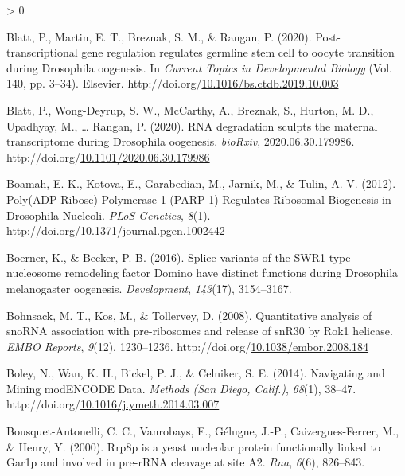 \documentclass[12pt,oneside]{reedthesis}
\newlength{\cslhangindent}
\newenvironment{CSLReferences}[2] %
 {%
  \setlength{\parindent}{0pt}
  \ifodd #1 \everypar{\setlength{\hangindent}{\cslhangindent}}\ignorespaces\fi
  \ifnum #2 > 0
  \setlength{\parskip}{#2\baselineskip}
  \fi
 }%
 {}
\begin{document}
\begin{CSLReferences}{1}{0}
\leavevmode\hypertarget{ref-blattPosttranscriptionalGeneRegulation2020}{}%
Blatt, P., Martin, E. T., Breznak, S. M., \& Rangan, P. (2020). Post-transcriptional gene regulation regulates germline stem cell to oocyte transition during {Drosophila} oogenesis. In \emph{Current {Topics} in {Developmental Biology}} (Vol. 140, pp. 3--34). {Elsevier}. http://doi.org/\href{https://doi.org/10.1016/bs.ctdb.2019.10.003}{10.1016/bs.ctdb.2019.10.003}

\leavevmode\hypertarget{ref-blattRNADegradationSculpts2020}{}%
Blatt, P., Wong-Deyrup, S. W., McCarthy, A., Breznak, S., Hurton, M. D., Upadhyay, M., \ldots{} Rangan, P. (2020). {RNA} degradation sculpts the maternal transcriptome during {Drosophila} oogenesis. \emph{bioRxiv}, 2020.06.30.179986. http://doi.org/\href{https://doi.org/10.1101/2020.06.30.179986}{10.1101/2020.06.30.179986}

\leavevmode\hypertarget{ref-boamahPolyADPRibosePolymerase2012}{}%
Boamah, E. K., Kotova, E., Garabedian, M., Jarnik, M., \& Tulin, A. V. (2012). Poly({ADP}-{Ribose}) {Polymerase} 1 ({PARP}-1) {Regulates Ribosomal Biogenesis} in {Drosophila Nucleoli}. \emph{PLoS Genetics}, \emph{8}(1). http://doi.org/\href{https://doi.org/10.1371/journal.pgen.1002442}{10.1371/journal.pgen.1002442}

\leavevmode\hypertarget{ref-Boerner2016}{}%
Boerner, K., \& Becker, P. B. (2016). Splice variants of the {SWR1}-type nucleosome remodeling factor {Domino} have distinct functions during {Drosophila} melanogaster oogenesis. \emph{Development}, \emph{143}(17), 3154--3167.

\leavevmode\hypertarget{ref-bohnsackQuantitativeAnalysisSnoRNA2008}{}%
Bohnsack, M. T., Kos, M., \& Tollervey, D. (2008). Quantitative analysis of {snoRNA} association with pre-ribosomes and release of {snR30} by {Rok1} helicase. \emph{EMBO Reports}, \emph{9}(12), 1230--1236. http://doi.org/\href{https://doi.org/10.1038/embor.2008.184}{10.1038/embor.2008.184}

\leavevmode\hypertarget{ref-boleyNavigatingMiningModENCODE2014}{}%
Boley, N., Wan, K. H., Bickel, P. J., \& Celniker, S. E. (2014). Navigating and {Mining modENCODE Data}. \emph{Methods (San Diego, Calif.)}, \emph{68}(1), 38--47. http://doi.org/\href{https://doi.org/10.1016/j.ymeth.2014.03.007}{10.1016/j.ymeth.2014.03.007}

\leavevmode\hypertarget{ref-Bousquet-Antonelli2000a}{}%
Bousquet-Antonelli, C. C., Vanrobays, E., Gélugne, J.-P., Caizergues-Ferrer, M., \& Henry, Y. (2000). Rrp8p is a yeast nucleolar protein functionally linked to {Gar1p} and involved in pre-{rRNA} cleavage at site {A2}. \emph{Rna}, \emph{6}(6), 826--843.


\end{CSLReferences}
\end{document}
